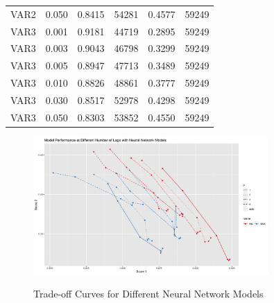 \documentclass{article}
\begin{document}
\begin{table}[htbp]
\begin{center}
\begin{tabular}{l|l|*{4}{c}}
      VAR2 & 0.050 & 0.8415 & 54281 & 0.4577 & 59249\\
      VAR3 & 0.001 & 0.9181 & 44719 & 0.2895 & 59249\\
      VAR3 & 0.003 & 0.9043 & 46798 & 0.3299 & 59249\\
      VAR3 & 0.005 & 0.8947 & 47713 & 0.3489 & 59249\\
      VAR3 & 0.010 & 0.8826 & 48861 & 0.3777 & 59249\\
      VAR3 & 0.030 & 0.8517 & 52978 & 0.4298 & 59249\\
      VAR3 & 0.050 & 0.8303 & 53852 & 0.4550 & 59249\\
    \end{tabular}
  \end{center}
\end{table}

\begin{figure}[htbp]
    \caption{Trade-off Curves for Different Neural Network Models}
    \centering
    \includegraphics[width = 0.8\textwidth]{images/ModelPerformanceatDifferentNumberofLagswithNeuralNetworkModels.png}
    \label{fig:fig1.3.7}
\end{figure}
\end{document}
